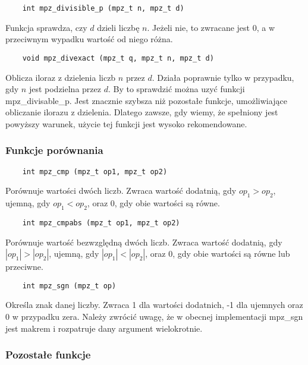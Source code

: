 \documentclass[oneside,a4paper]{book}
\begin{document}
	\begin{lstlisting}
	int mpz_divisible_p (mpz_t n, mpz_t d)
	\end{lstlisting}
	
	Funkcja sprawdza, czy $d$ dzieli liczbę $n$. Jeżeli nie, to zwracane jest $0$, a w przeciwnym wypadku wartość od niego różna.
	
	\begin{lstlisting}
	void mpz_divexact (mpz_t q, mpz_t n, mpz_t d)
	\end{lstlisting}
	
	Oblicza iloraz z dzielenia liczb $n$ przez $d$. Działa poprawnie tylko w przypadku, gdy $n$ jest podzielna przez $d$. By to sprawdzić można uzyć funkcji mpz\_divisable\_p. Jest znacznie szybsza niż pozostałe funkcje, umożliwiające obliczanie ilorazu z dzielenia. Dlatego zawsze, gdy wiemy, że spełniony jest powyższy warunek, użycie tej funkcji jest wysoko rekomendowane.
	
	\subsubsection{Funkcje porównania}
	
	\begin{lstlisting}
	int mpz_cmp (mpz_t op1, mpz_t op2)
	\end{lstlisting}
	
	Porównuje wartości dwóch liczb. Zwraca wartość dodatnią, gdy $op_1>op_2$, ujemną, gdy $op_1<op_2$, oraz $0$, gdy obie wartości są równe.
	
	\begin{lstlisting}
	int mpz_cmpabs (mpz_t op1, mpz_t op2)
	\end{lstlisting}
	
	Porównuje wartość bezwzględną dwóch liczb. Zwraca wartość dodatnią, gdy $|op_1|>|op_2|$, ujemną, gdy $|op_1|<|op_2|$, oraz $0$, gdy obie wartości są równe lub przeciwne.
	
	\begin{lstlisting}
	int mpz_sgn (mpz_t op)
	\end{lstlisting}
	
	Określa znak danej liczby. Zwraca 1 dla wartości dodatnich, -1 dla ujemnych oraz $0$ w przypadku zera. Należy zwrócić uwagę, że w obecnej implementacji mpz\_sgn jest makrem i rozpatruje dany argument wielokrotnie.
	
	\subsubsection{Pozostałe funkcje}
	
\end{document}

